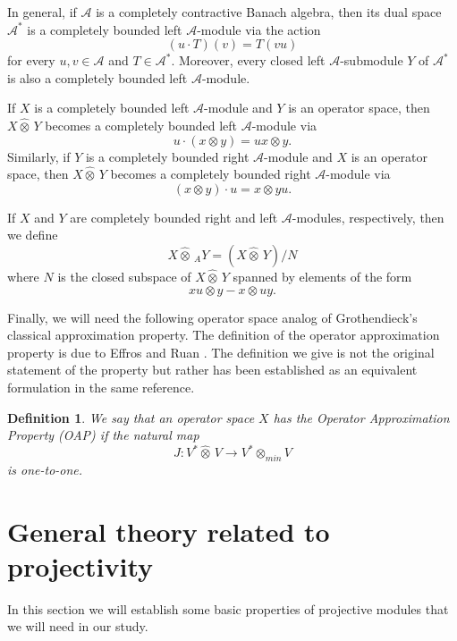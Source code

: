 \documentclass[10pt]{amsart}
\newtheorem{defn}[thm]{Definition}
\numberwithin{thm}{section}
\numberwithin{equation}{section}
\begin{document}
In general, if $\mathcal{A}$ is a completely contractive Banach algebra, then its dual 
space $\mathcal{A}^*$ is a completely bounded left $\mathcal{A}$-module via the action 
\[(u\cdot T)(v)=T(vu)\]
for every $u,v\in \mathcal{A}$ and $T\in \mathcal{A}^*$. Moreover, every closed left 
$\mathcal{A}$-submodule $Y$ of $\mathcal{A}^*$ is also a completely bounded left $\mathcal{A}$-module.

If $X$ is a completely bounded left $\mathcal{A}$-module and $Y$ is an operator space, then 
$X\widehat{\otimes}\, Y$ becomes a completely bounded left $\mathcal{A}$-module via
\[u\cdot (x\otimes y)=ux\otimes y.\]
Similarly, if $Y$ is a completely bounded right $\mathcal{A}$-module and $X$ is an operator space, then 
$X\widehat{\otimes}\, Y$ becomes a completely bounded right $\mathcal{A}$-module via
\[(x\otimes y)\cdot u=x\otimes yu.\]

If $X$ and $Y$ are completely bounded right and left $\mathcal{A}$-modules, respectively, then we define 
\[X\widehat{\otimes}\,_{A}Y=(X\widehat{\otimes}\,Y)/N\]
where $N$ is the closed subspace of $X\widehat{\otimes}\,Y$ spanned by elements of the form
\[xu\otimes y-x\otimes uy.\]

Finally, we will need the following operator space analog of Grothendieck's classical approximation property.
The definition of the operator approximation property is due to Effros and Ruan \cite{ER00}. The definition 
we give is not the original statement of the property but rather has been established as an 
equivalent formulation in the same reference.

\begin{defn}\label{def-OAP}
We say that an operator space $X$ has the \textit{Operator Approximation Property} (OAP) if
the natural map 
\[J:V^*\widehat{\otimes}\,V\rightarrow V^*\otimes _{min}V\]
is one-to-one.

\end{defn}

 
\section{General theory related to projectivity}

In this section we will establish some basic properties of projective modules that we will need in our study. 
\end{document}
